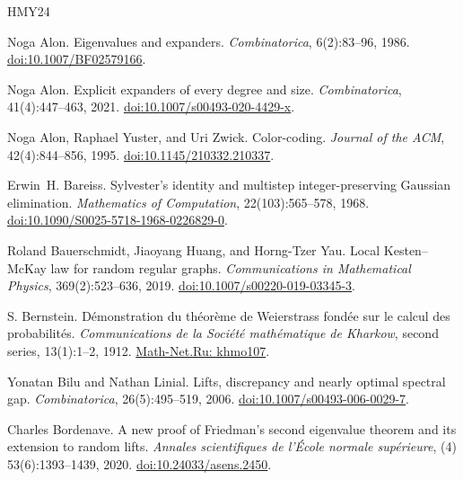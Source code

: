 \begingroup
\small
\begin{thebibliography}{HMY24}
\raggedright

Noga Alon.
\newblock Eigenvalues and expanders.
\newblock \emph{Combinatorica}, 6(2):83--96, 1986.
\newblock \href{https://doi.org/10.1007/BF02579166}{doi:10.1007/BF02579166}.

Noga Alon.
\newblock Explicit expanders of every degree and size.
\newblock \emph{Combinatorica}, 41(4):447--463, 2021.
\newblock \href{https://doi.org/10.1007/s00493-020-4429-x}{doi:10.1007/s00493-020-4429-x}.

Noga Alon, Raphael Yuster, and Uri Zwick.
\newblock Color-coding.
\newblock \emph{Journal of the ACM}, 42(4):844--856, 1995.
\newblock \href{https://doi.org/10.1145/210332.210337}{doi:10.1145/210332.210337}.

Erwin~H. Bareiss.
\newblock Sylvester's identity and multistep integer-preserving Gaussian elimination.
\newblock \emph{Mathematics of Computation}, 22(103):565--578, 1968.
\newblock \href{https://doi.org/10.1090/S0025-5718-1968-0226829-0}{doi:10.1090/S0025-5718-1968-0226829-0}.

Roland Bauerschmidt, Jiaoyang Huang, and Horng-Tzer Yau.
\newblock Local Kesten--McKay law for random regular graphs.
\newblock \emph{Communications in Mathematical Physics}, 369(2):523--636, 2019.
\newblock \href{https://doi.org/10.1007/s00220-019-03345-3}{doi:10.1007/s00220-019-03345-3}.

S. Bernstein.
\newblock D\'emonstration du th\'eor\`eme de Weierstrass fond\'ee sur le calcul des probabilit\'es.
\newblock \emph{Communications de la Soci\'et\'e math\'ematique de Kharkow},
  second series, 13(1):1--2, 1912.
\newblock \href{https://www.mathnet.ru/eng/khmo107}{Math-Net.Ru: khmo107}.

Yonatan Bilu and Nathan Linial.
\newblock Lifts, discrepancy and nearly optimal spectral gap.
\newblock \emph{Combinatorica}, 26(5):495--519, 2006.
\newblock \href{https://doi.org/10.1007/s00493-006-0029-7}{doi:10.1007/s00493-006-0029-7}.

Charles Bordenave.
\newblock A new proof of Friedman's second eigenvalue theorem and its
  extension to random lifts.
\newblock \emph{Annales scientifiques de l'\'Ecole normale sup\'erieure},
  (4) 53(6):1393--1439, 2020.
\newblock \href{https://doi.org/10.24033/asens.2450}{doi:10.24033/asens.2450}.


\end{thebibliography}
